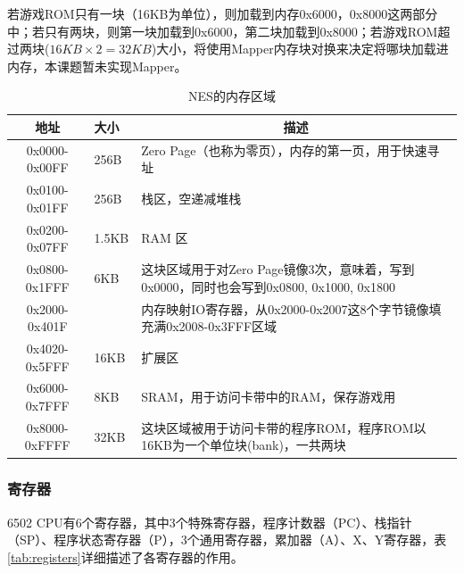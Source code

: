 \documentclass[a4paper]{ltxdoc}
\begin{document}
{若游戏ROM只有一块（16KB为单位），则加载到内存0x6000，0x8000这两部分中；若只有两块，则第一块加载到0x6000，第二块加载到0x8000；若游戏ROM超过两块($16KB\times 2 = 32KB$)大小，将使用Mapper内存块对换来决定将哪块加载进内存，本课题暂未实现Mapper。
\begin{table}[h]
\centering
\caption{NES的内存区域}
\label{tab:memory_map}
\begin{tabularx}{\textwidth}{|c|l|X|}
\hline
\rowcolor[HTML]{8DCDFF}
地址            & 大小                     & \multicolumn{1}{c|}{\cellcolor[HTML]{8DCDFF}描述}                \\ \hline
0x0000-0x00FF & 256B                   & Zero Page（也称为零页），内存的第一页，用于快速寻址                                 \\ \hline
0x0100-0x01FF & 256B                   & 栈区，空递减堆栈                                                             \\ \hline
0x0200-0x07FF & 1.5KB                  & RAM 区                                                          \\ \hline
0x0800-0x1FFF & 6KB                    & 这块区域用于对Zero Page镜像3次，意味着，写到0x0000，同时也会写到0x0800, 0x1000, 0x1800 \\ \hline
0x2000-0x401F &                        & 内存映射IO寄存器，从0x2000-0x2007这8个字节镜像填充满0x2008-0x3FFF区域              \\ \cline{1-1} \cline{3-3}
0x4020-0x5FFF & \multirow{-2}{*}{16KB} & 扩展区                                                            \\ \hline
0x6000-0x7FFF & 8KB                    & SRAM，用于访问卡带中的RAM，保存游戏用                                         \\ \hline
0x8000-0xFFFF & 32KB                   & 这块区域被用于访问卡带的程序ROM，程序ROM以16KB为一个单位块(bank)，一共两块                  \\ \hline
\end{tabularx}
\end{table}

\subsubsection{寄存器}
6502 CPU有6个寄存器，其中3个特殊寄存器，程序计数器（PC）、栈指针（SP）、程序状态寄存器（P），3个通用寄存器，累加器（A）、X、Y寄存器，表\ref{tab:registers}详细描述了各寄存器的作用。

}
\end{document}
